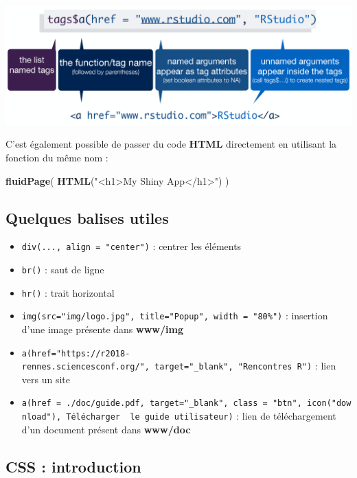 \documentclass[]{article}
\newenvironment{Shaded}{\begin{snugshade}}{\end{snugshade}}
\newcommand{\KeywordTok}[1]{\textcolor[rgb]{0.13,0.29,0.53}{\textbf{#1}}}
\newcommand{\StringTok}[1]{\textcolor[rgb]{0.31,0.60,0.02}{#1}}
\newcommand{\NormalTok}[1]{#1}
\providecommand{\tightlist}{%
  \setlength{\itemsep}{0pt}\setlength{\parskip}{0pt}}
\begin{document}
\includegraphics{img/tags.png}

C'est également possible de passer du code \textbf{HTML} directement en
utilisant la fonction du même nom :

\begin{Shaded}
\begin{Highlighting}[]
\KeywordTok{fluidPage}\NormalTok{(}
  \KeywordTok{HTML}\NormalTok{(}\StringTok{"<h1>My Shiny App</h1>"}\NormalTok{) }
\NormalTok{)}
\end{Highlighting}
\end{Shaded}

\subsection{Quelques balises utiles}\label{quelques-balises-utiles}

\begin{itemize}
\tightlist
\item
  \texttt{div(...,\ align\ =\ "center")} : centrer les éléments
\item
  \texttt{br()} : saut de ligne
\item
  \texttt{hr()} : trait horizontal
\item
  \texttt{img(src="img/logo.jpg",\ title="Popup",\ width\ =\ "80\%")} :
  insertion d'une image présente dans \textbf{www/img}
\item
  \texttt{a(href="https://r2018-rennes.sciencesconf.org/",\ target="\_blank",\ "Rencontres\ R")}
  : lien vers un site
\item
  \texttt{a(href\ =\ \textquotesingle{}./doc/guide.pdf\textquotesingle{},\ target="\_blank",\ class\ =\ "btn",\ icon("download"),\ \textquotesingle{}Télécharger\ \ le\ guide\ utilisateur\textquotesingle{})}
  : lien de téléchargement d'un document présent dans \textbf{www/doc}
\end{itemize}

\subsection{CSS : introduction}\label{css-introduction}
\end{document}
